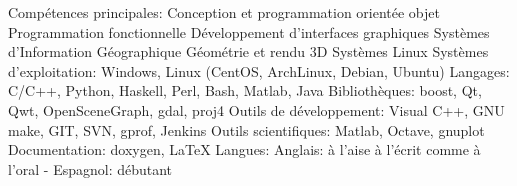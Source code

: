 \begin{cvskills}
  \cvskill
    {Compétences principales:}
 	{
		Conception et programmation orientée objet \newline
        Programmation fonctionnelle \newline
 	 	Développement d'interfaces graphiques \newline
 	 	Systèmes d'Information Géographique \newline
	 	Géométrie et rendu 3D \newline
	 	Systèmes Linux
	}
  \cvskill
    {Systèmes d'exploitation:}
 	{Windows, Linux (CentOS, ArchLinux, Debian, Ubuntu)}
  \cvskill
    {Langages:}
 	{C/C++, Python, Haskell, Perl, Bash, Matlab, Java}
  \cvskill
    {Bibliothèques:}
 	{boost, Qt, Qwt, OpenSceneGraph, gdal, proj4}
  \cvskill
	{Outils de développement:}
	{Visual C++, GNU make, GIT, SVN, gprof, Jenkins}
  \cvskill
	{Outils scientifiques:}
	{Matlab, Octave, gnuplot}
  \cvskill
	{Documentation:}
	{doxygen, \LaTeX}
  \cvskill
    {Langues:}
 	{Anglais: à l'aise à l'écrit comme à l'oral - Espagnol: débutant}
\end{cvskills}

